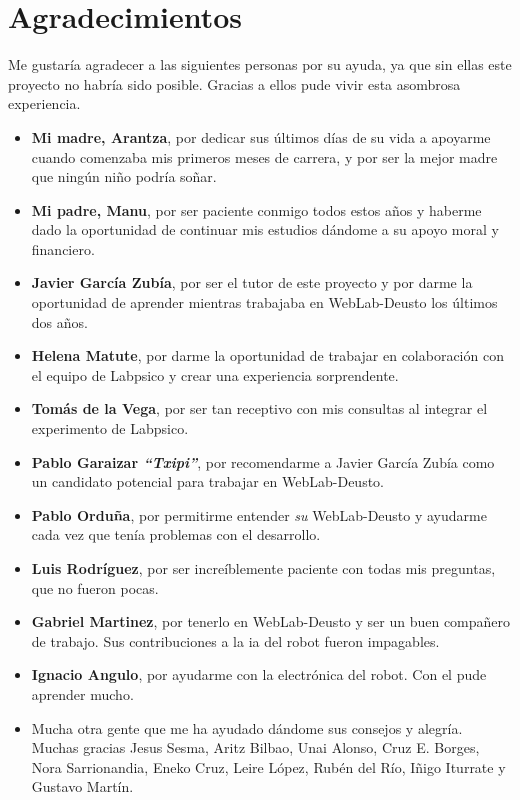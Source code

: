 \chapter*{Agradecimientos}

Me gustaría agradecer a las siguientes personas por su ayuda, ya que sin ellas este proyecto no
habría sido posible. Gracias a ellos pude vivir esta asombrosa experiencia.

\begin{itemize}
	\item \textbf{Mi madre, Arantza}, por dedicar sus últimos días de su vida a apoyarme cuando
	comenzaba mis primeros meses de carrera, y por ser la mejor madre que ningún niño podría soñar.

	\item \textbf{Mi padre, Manu}, por ser paciente conmigo todos estos años y haberme dado la
	oportunidad de continuar mis estudios dándome a su apoyo moral y financiero.

	\item \textbf{Javier García Zubía}, por ser el tutor de este proyecto y por darme la oportunidad
	de aprender mientras trabajaba en WebLab-Deusto los últimos dos años.

	\item \textbf{Helena Matute}, por darme la oportunidad de trabajar en colaboración con el equipo
	de Labpsico y crear una experiencia sorprendente.

	\item \textbf{Tomás de la Vega}, por ser tan receptivo con mis consultas al integrar el
	experimento de Labpsico.

	\item \textbf{Pablo Garaizar \emph{``Txipi''}}, por recomendarme a Javier García Zubía como un
	candidato potencial para trabajar en WebLab-Deusto.

	\item \textbf{Pablo Orduña}, por permitirme entender \emph{su} WebLab-Deusto y ayudarme cada
	vez que tenía problemas con el desarrollo.

	\item \textbf{Luis Rodríguez}, por ser increíblemente paciente con todas mis preguntas, que no
	fueron pocas.

	\item \textbf{Gabriel Martinez}, por tenerlo en WebLab-Deusto y ser un buen compañero de
	trabajo. Sus contribuciones a la \acrshort{ia} del robot fueron impagables.

	\item \textbf{Ignacio Angulo}, por ayudarme con la electrónica del robot. Con el pude aprender
	mucho.

	\item Mucha otra gente que me ha ayudado dándome sus consejos y alegría. Muchas gracias Jesus
	Sesma, Aritz Bilbao, Unai Alonso, Cruz E. Borges, Nora Sarrionandia, Eneko Cruz, Leire López,
	Rubén del Río, Iñigo Iturrate y Gustavo Martín.
\end{itemize}

